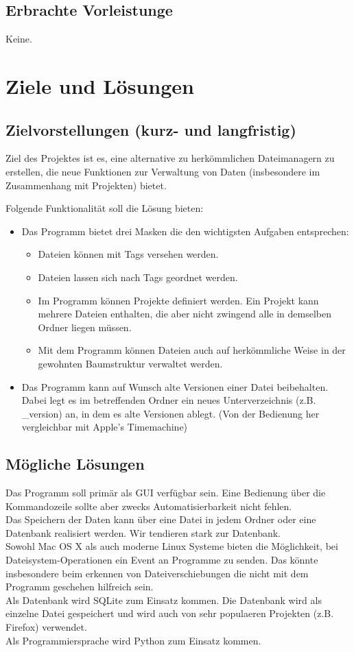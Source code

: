 \documentclass[10pt,paper=a4,final]{scrartcl}
\begin{document}
\subsection{Erbrachte Vorleistunge}
Keine.
\section{Ziele und L\"osungen}
\subsection{Zielvorstellungen (kurz- und langfristig)}
Ziel des Projektes ist es, eine alternative zu herk\"ommlichen Dateimanagern zu erstellen, die neue Funktionen zur Verwaltung von Daten (insbesondere im Zusammenhang mit Projekten) bietet.

Folgende Funktionalit\"at soll die L\"osung bieten:
\begin{itemize}
  \item Das Programm bietet drei Masken die den wichtigsten Aufgaben entsprechen:
  \begin{itemize}
    \item Dateien k\"onnen mit Tags versehen werden.
    \item Dateien lassen sich nach Tags geordnet werden.
    \item Im Programm k\"onnen Projekte definiert werden. Ein Projekt kann mehrere Dateien enthalten, die aber nicht zwingend alle in demselben Ordner liegen m\"ussen.
    \item Mit dem Programm k\"onnen Dateien auch auf herk\"ommliche Weise in der gewohnten Baumstruktur verwaltet werden.
  \end{itemize}
  \item Das Programm kann auf Wunsch alte Versionen einer Datei beibehalten. Dabei legt es im betreffenden Ordner ein neues Unterverzeichnis (z.B. \_version) an, in dem es alte Versionen ablegt. (Von der Bedienung her vergleichbar mit Apple’s Timemachine)
\end{itemize}
\subsection{Mögliche Lösungen}
Das Programm soll primär als GUI verfügbar sein. Eine Bedienung über die Kommandozeile sollte aber zwecks Automatisierbarkeit nicht fehlen.\\ 
Das Speichern der Daten kann über eine Datei in jedem Ordner oder eine Datenbank realisiert werden. Wir tendieren stark zur Datenbank.\\
Sowohl Mac OS X als auch moderne Linux Systeme bieten die M\"oglichkeit, bei Dateisystem-Operationen ein Event an Programme zu senden. Das k\"onnte insbesondere beim erkennen von Dateiverschiebungen die nicht mit dem Programm geschehen hilfreich sein.\\
Als Datenbank wird SQLite zum Einsatz kommen. Die Datenbank wird als einzelne Datei gespeichert und wird auch von sehr populaeren Projekten (z.B. Firefox) verwendet.\\
Als Programmiersprache wird Python zum Einsatz kommen.
\end{document}
